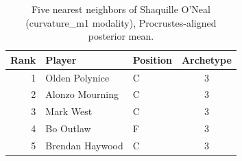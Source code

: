\begin{table}[htbp]
  \centering\small
  \begin{tabular}{rllc}
    \toprule
    Rank & Player & Position & Archetype \\
    \midrule
    1 & Olden Polynice & C & 3 \\
    2 & Alonzo Mourning & C & 3 \\
    3 & Mark West & C & 3 \\
    4 & Bo Outlaw & F & 3 \\
    5 & Brendan Haywood & C & 3 \\
    \bottomrule
  \end{tabular}
  \caption{Five nearest neighbors of Shaquille O'Neal (curvature_m1 modality), Procrustes-aligned posterior mean.}
  \label{tab:Shaquille_O_Neal_neighbors_curvature_m1}
\end{table}

